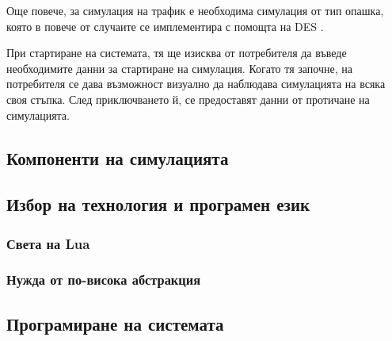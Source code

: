 		Още повече, за симулация на трафик е необходима симулация от тип опашка, която в повече от случаите
		се имплементира с помощта на \ac{DES} \cite{Barlas}.
		
		При стартиране на системата, тя ще изисква от потребителя да въведе необходимите данни за 
		стартиране на симулация. Когато тя започне, на потребителя се дава възможност визуално
		да наблюдава симулацията на всяка своя стъпка. След приключването й, се предоставят
		данни от протичане на симулацията.
	
	\subsection{Компоненти на симулацията}		
	\subsection{Избор на технология и програмен език}
		\subsubsection{Света на Lua}
		\subsubsection{Нужда от по-висока абстракция}
	\subsection{Програмиране на системата}